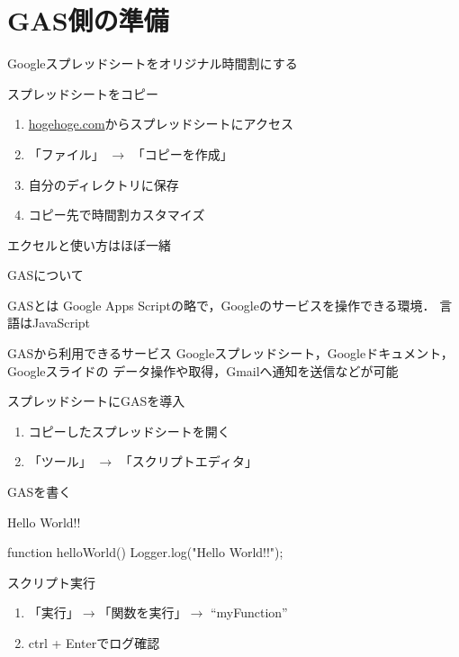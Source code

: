 \documentclass[dvipdfmx,xcolor={svgnames}]{beamer}
\begin{document}
  \section{GAS側の準備}
  \begin{frame}{Googleスプレッドシートをオリジナル時間割にする}
    \begin{block}{スプレッドシートをコピー}
      \begin{enumerate}\setlength{\itemsep}{15pt}
        \item \url{hogehoge.com}からスプレッドシートにアクセス
        \item 「ファイル」 $\rightarrow$ 「コピーを作成」
        \item 自分のディレクトリに保存
        \item コピー先で時間割カスタマイズ
      \end{enumerate}
    \end{block}
    {\huge エクセルと使い方はほぼ一緒}
    \end{frame}
  \begin{frame}{GASについて}
    \begin{block}{GASとは}
      Google Apps Scriptの略で，Googleのサービスを操作できる環境．
      言語はJavaScript
    \end{block}
    \begin{block}{GASから利用できるサービス}
      Googleスプレッドシート，Googleドキュメント，Googleスライドの
      データ操作や取得，Gmailへ通知を送信などが可能
    \end{block}
  \end{frame}
  \begin{frame}{スプレッドシートにGASを導入}
    \begin{enumerate}  \setlength{\itemsep}{20pt}\LARGE
      \item コピーしたスプレッドシートを開く
      \item 「ツール」 $\rightarrow$ 「スクリプトエディタ」
    \end{enumerate}
  \end{frame}

  \begin{frame}[fragile]{GASを書く}
    \begin{exampleblock}{Hello World!!}
      \begin{GAS}
function helloWorld(){
  Logger.log("Hello World!!");
}
      \end{GAS}
    \end{exampleblock}
    \begin{block}{スクリプト実行}
      \begin{enumerate}
        \item 「実行」$\rightarrow$「関数を実行」$\rightarrow$ ``myFunction''
        \item ctrl + Enterでログ確認
      \end{enumerate}
    \end{block}
  \end{frame}
\end{document}
